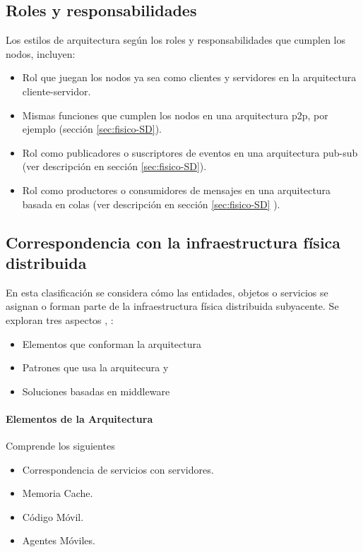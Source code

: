 \subsection { Roles y responsabilidades} 
\label{subsec:roles}
Los estilos de arquitectura seg\'un los roles y responsabilidades que cumplen los nodos,  incluyen: 
\begin{itemize}
	\item Rol que juegan los nodos ya sea como clientes y servidores en la arquitectura cliente-servidor. 
	\item Mismas funciones que cumplen los nodos en una arquitectura p2p, por ejemplo (sección \ref{sec:fisico-SD}).
	\item Rol como publicadores o suscriptores de eventos en una arquitectura pub-sub (ver descripci\'on en sección \ref{sec:fisico-SD}).
	\item Rol como productores o consumidores de mensajes en una arquitectura basada en colas (ver descripci\'on en sección \ref{sec:fisico-SD} ).
	
\end{itemize}

\subsection{Correspondencia con la infraestructura física distribuida}
\label{subsec:corresp}

En esta clasificaci\'on se considera  cómo las entidades, objetos o servicios se asignan o forman parte de la infraestructura física distribuida subyacente. Se exploran tres aspectos \cite{Coulouris2011}, \cite{Limoncelli2014}:

\begin{itemize}
	\item Elementos que conforman la arquitectura
	\item Patrones que usa la arquitecura  y
	\item Soluciones basadas en middleware 
\end{itemize}


\paragraph{Elementos de la Arquitectura}

	 	\begin{tcolorbox}
		[colback=red!5!white,colframe=red!75!black,fonttitle=\bfseries,title= Elementos de la Arquitectura]
			Comprende los siguientes 
		\begin{itemize}
			\item Correspondencia de servicios con servidores.  				
			\item Memoria Cache.
			\item Código Móvil.
			\item Agentes Móviles.
		\end{itemize}
	\end{tcolorbox}
	
